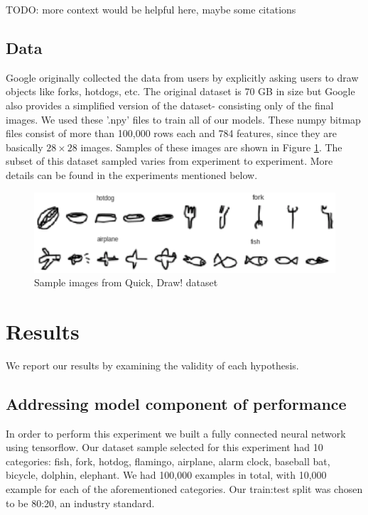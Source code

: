 \documentclass[12pt]{article}
\begin{document}
TODO: more context would be helpful here, maybe some citations

\subsection{Data}

Google originally collected the data from users by explicitly asking users to
draw objects like forks, hotdogs, etc. The original dataset is 70 GB in size
but Google also provides a simplified version of the dataset- consisting only
of the final images. We used these '.npy' files to train all of our models.
These numpy bitmap files consist of more than 100,000 rows each and 784
features, since they are basically $28 \times 28$ images. Samples of these
images are shown in Figure \ref{fig:quickImages}. The subset of this
dataset sampled varies from experiment to experiment. More details can be
found in the experiments mentioned below.

\begin{figure}[h]
  \begin{center}
    \includegraphics[scale=0.5]{fig1}
  \end{center}
  \caption{Sample images from Quick, Draw! dataset}
  \label{fig:quickImages}
\end{figure}

\section{Results}

We report our results by examining the validity of each hypothesis.

\subsection{Addressing model component of performance}

In order to perform this experiment we built a fully connected neural network
using tensorflow. Our dataset sample selected for this experiment had 10
categories: fish, fork, hotdog, flamingo, airplane, alarm clock, baseball bat,
bicycle, dolphin, elephant. We had 100,000 examples in total, with 10,000
example for each of the aforementioned categories. Our train:test split was
chosen to be 80:20, an industry standard. 
\end{document}
